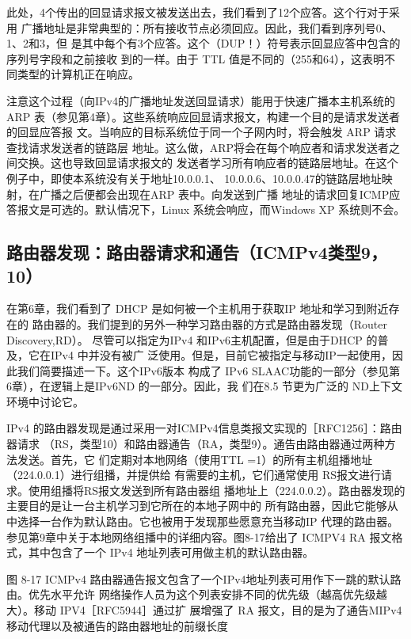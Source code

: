 此处，4个传出的回显请求报文被发送出去，我们看到了12个应答。这个行对于采用
广播地址是非常典型的：所有接收节点必须回应。因此，我们看到序列号0、1、2和3，但
是其中每个有3个应答。这个（DUP！）符号表示回显应答中包含的序列号字段和之前接收
到的一样。由于 TTL 值是不同的（255和64），这表明不同类型的计算机正在响应。

注意这个过程（向IPv4的广播地址发送回显请求）能用于快速广播本主机系统的 ARP
表（参见第4章）。这些系统响应回显请求报文，构建一个目的是请求发送者的回显应答报
文。当响应的目标系统位于同一个子网内时，将会触发 ARP 请求查找请求发送者的链路层
地址。这么做，ARP将会在每个响应者和请求发送者之间交换。这也导致回显请求报文的
发送者学习所有响应者的链路层地址。在这个例子中，即使本系统没有关于地址10.0.0.1、
10.0.0.6、10.0.0.47的链路层地址映射，在广播之后便都会出现在ARP 表中。向发送到广播
地址的请求回复ICMP应答报文是可选的。默认情况下，Linux 系统会响应，而Windows XP
系统则不会。

\subsection{路由器发现：路由器请求和通告（ICMPv4类型9，10）}
在第6章，我们看到了 DHCP 是如何被一个主机用于获取IP 地址和学习到附近存在的
路由器的。我们提到的另外一种学习路由器的方式是路由器发现（Router Discovery,RD）。
尽管可以指定为IPv4 和IPv6主机配置，但是由于DHCP 的普及，它在IPv4 中并没有被广
泛使用。但是，目前它被指定与移动IP一起使用，因此我们简要描述一下。这个IPv6版本
构成了 IPv6 SLAAC功能的一部分（参见第6章），在逻辑上是IPv6ND 的一部分。因此，我
们在8.5 节更为广泛的 ND上下文环境中讨论它。

IPv4 的路由器发现是通过采用一对ICMPv4信息类报文实现的［RFC1256］：路由器请求
（RS，类型10）和路由器通告（RA，类型9）。通告由路由器通过两种方法发送。首先，它
们定期对本地网络（使用TTL =1）的所有主机组播地址（224.0.0.1）进行组播，并提供给
有需要的主机，它们通常使用 RS报文进行请求。使用组播将RS报文发送到所有路由器组
播地址上（224.0.0.2）。路由器发现的主要目的是让一台主机学习到它所在的本地子网中的
所有路由器，因此它能够从中选择一台作为默认路由。它也被用于发现那些愿意充当移动IP
代理的路由器。参见第9章中关于本地网络组播中的详细内容。图8-17给出了 ICMPV4 RA
报文格式，其中包含了一个 IPv4 地址列表可用做主机的默认路由器。

图 8-17 ICMPv4 路由器通告报文包含了一个IPv4地址列表可用作下一跳的默认路由。优先水平允许
网络操作人员为这个列表安排不同的优先级（越高优先级越大）。移动 IPV4［RFC5944］通过扩
展增强了 RA 报文，目的是为了通告MIPv4 移动代理以及被通告的路由器地址的前缀长度

